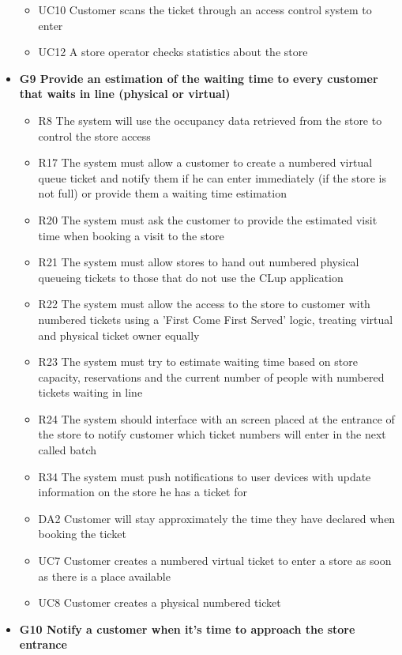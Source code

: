 \begin{itemize}
\begin{itemize}
        \medskip
        \item UC10 Customer scans the ticket through an access control system to enter
        \item UC12 A store operator checks statistics about the store
    \end{itemize}     
    \item \textbf{G9 Provide an estimation of the waiting time to every customer that waits in line (physical or virtual)}
    \begin{itemize}
        \item R8 The system will use the occupancy data retrieved from the store to control the store access
        \item R17 The system must allow a customer to create a numbered virtual queue ticket and notify them if he can enter immediately (if the store is not full) or provide them a waiting time estimation
        \item R20 The system must ask the customer to provide the estimated visit time when booking a visit to the store
        \item R21 The system must allow stores to hand out numbered physical queueing tickets to those that do not use the CLup application
        \item R22 The system must allow the access to the store to customer with numbered tickets using a ’First Come First Served’ logic, treating virtual and physical ticket owner equally
        \item R23 The system must try to estimate waiting time based on store capacity, reservations and the current number of people with numbered tickets waiting in line
        \item R24 The system should interface with an screen placed at the entrance of the store to notify customer which ticket numbers will enter in the next called batch
        \item R34 The system must push notifications to user devices with update information on the store he has a ticket for
        \medskip
        \item DA2 Customer will stay approximately the time they have declared when booking the ticket
        \medskip
        \item UC7 Customer creates a numbered virtual ticket to enter a store as soon as there is a place available
        \item UC8 Customer creates a physical numbered ticket
    \end{itemize}
    \item \textbf{G10 Notify a customer when it's time to approach the store entrance}

\end{itemize}
